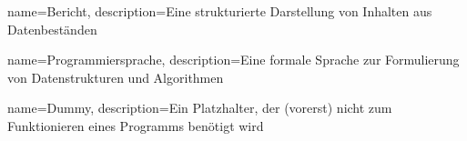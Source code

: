 
{
    name=Bericht,
    description={Eine strukturierte Darstellung von Inhalten aus Datenbeständen}
}

{
    name=Programmiersprache,
    description={Eine formale Sprache zur Formulierung von Datenstrukturen und Algorithmen}
}

{
    name=Dummy,
    description={Ein Platzhalter, der (vorerst) nicht zum Funktionieren eines Programms benötigt wird}
}

